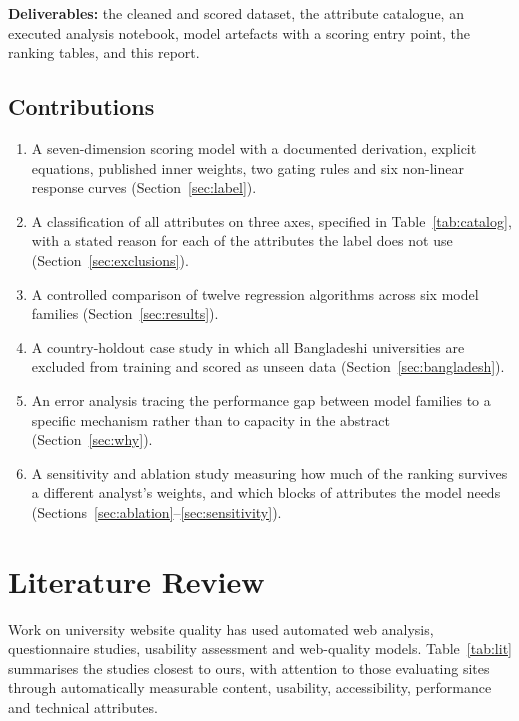 \documentclass[11pt,a4paper]{article}
\begin{document}
\noindent\textbf{Deliverables:} the cleaned and scored dataset, the attribute catalogue, an executed
analysis notebook, model artefacts with a scoring entry point, the ranking tables, and this report.

\subsection{Contributions}

\begin{enumerate}
\item A seven-dimension scoring model with a documented derivation, explicit equations, published
inner weights, two gating rules and six non-linear response curves (Section~\ref{sec:label}).
\item A classification of all \nFeat{} attributes on three axes, specified in
Table~\ref{tab:catalog}, with a stated reason for each of the \nUnscored{} attributes the label does
not use (Section~\ref{sec:exclusions}).
\item A controlled comparison of twelve regression algorithms across six model families
(Section~\ref{sec:results}).
\item A country-holdout case study in which all \nBD{} Bangladeshi universities are excluded from
training and scored as unseen data (Section~\ref{sec:bangladesh}).
\item An error analysis tracing the performance gap between model families to a specific mechanism
rather than to capacity in the abstract (Section~\ref{sec:why}).
\item A sensitivity and ablation study measuring how much of the ranking survives a different
analyst's weights, and which blocks of attributes the model needs
(Sections~\ref{sec:ablation}--\ref{sec:sensitivity}).
\end{enumerate}

\section{Literature Review}
\label{sec:lit}

Work on university website quality has used automated web analysis, questionnaire studies,
usability assessment and web-quality models. Table~\ref{tab:lit} summarises the studies closest to
ours, with attention to those evaluating sites through automatically measurable content, usability,
accessibility, performance and technical attributes.
\end{document}
